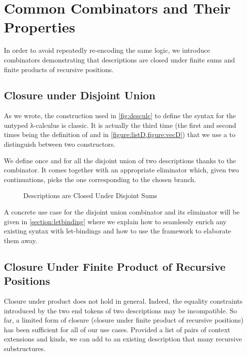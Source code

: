 \section{Common Combinators and Their Properties}\label{desccomb}

In order to avoid repeatedly re-encoding the same logic, we introduce
combinators demonstrating that descriptions are closed under finite
sums and finite products of recursive positions.

\subsection{Closure under Disjoint Union}

As we wrote, the construction used in \cref{fig:desculc} to define the
syntax for the untyped λ-calculus is classic. It is actually the third
time (the first and second times being the definition of  and
 in \cref{figure:listD,figure:vecD}) that we use a 
to distinguish between two constructors.

We define once and for all the disjoint union of two descriptions thanks
to the  combinator. It comes together with an appropriate
eliminator  which, given two continuations, picks the one
corresponding to the chosen branch.

\begin{figure}[h]
\caption{Descriptions are Closed Under Disjoint Sums\label{figure:descsum}}
\end{figure}

A concrete use case for the disjoint union combinator and its eliminator
will be given in \cref{section:letbinding} where we explain how to seamlessly
enrich any existing syntax with let-bindings and how to use the 
framework to elaborate them away.

\subsection{Closure Under Finite Product of Recursive Positions}

Closure under product does not hold in general. Indeed, the equality constraints
introduced by the two end tokens of two descriptions may be incompatible. So far,
a limited form of closure (closure under finite product of recursive positions)
has been sufficient for all of our use cases. Provided a list of pairs of context
extensions and kinds, we can add to an existing description that many recursive
substructures.

